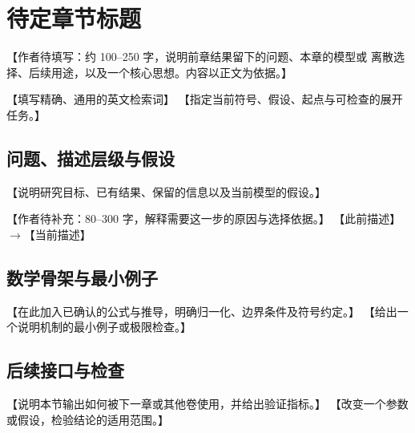 \chapter{待定章节标题}\label{template:v1}
\begin{chaptersummary}
【作者待填写：约 100--250 字，说明前章结果留下的问题、本章的模型或
离散选择、后续用途，以及一个核心思想。内容以正文为依据。】
\end{chaptersummary}
{【填写精确、通用的英文检索词】}
{【指定当前符号、假设、起点与可检查的展开任务。】}

\section{问题、描述层级与假设}
【说明研究目标、已有结果、保留的信息以及当前模型的假设。】

{【作者待补充：80--300 字，解释需要这一步的原因与选择依据。】}
{【此前描述】$\longrightarrow$【当前描述】}

\section{数学骨架与最小例子}
【在此加入已确认的公式与推导，明确归一化、边界条件及符号约定。】
【给出一个说明机制的最小例子或极限检查。】

\section{后续接口与检查}
【说明本节输出如何被下一章或其他卷使用，并给出验证指标。】
{【改变一个参数或假设，检验结论的适用范围。】}

